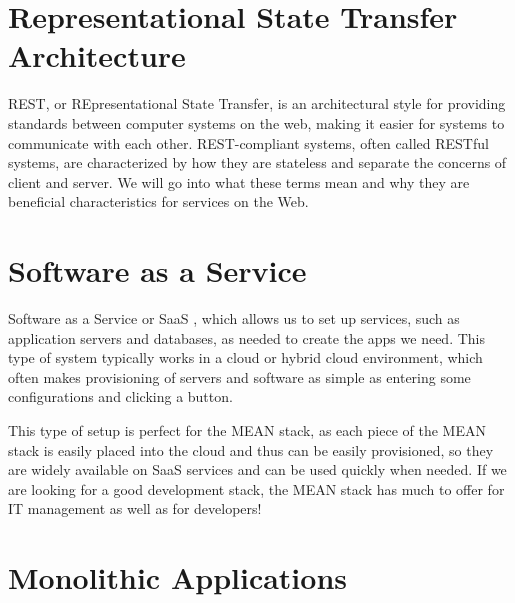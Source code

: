 \section{Representational State Transfer Architecture}
REST, or REpresentational State Transfer, is an architectural style for providing standards between computer systems on the web, making it easier for systems to communicate with each other. REST-compliant systems, often called RESTful systems, are characterized by how they are stateless and separate the concerns of client and server. We will go into what these terms mean and why they are beneficial characteristics for services on the Web.




\section{Software as a Service}
Software as a Service or SaaS , which allows us to set up services, such as application servers and databases, as needed to create the apps we need. This type of system typically works in a cloud or hybrid cloud environment, which often makes provisioning of servers and software as simple as entering some configurations and clicking a button.

This type of setup is perfect for the MEAN stack, as each piece of the MEAN stack is easily placed into the cloud and thus can be easily provisioned, so they are widely available on SaaS services and can be used quickly when needed. If we are looking for a good development stack, the MEAN stack has much to offer for IT management as well as for developers!



\section{Monolithic Applications}


